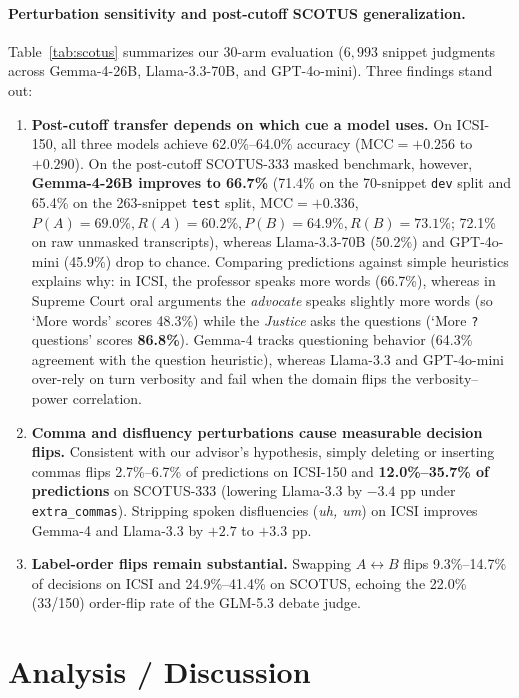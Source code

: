 \documentclass[11pt]{article}
\begin{document}
\paragraph{Perturbation sensitivity and post-cutoff SCOTUS generalization.}
Table~\ref{tab:scotus} summarizes our 30-arm evaluation ($6{,}993$ snippet judgments across Gemma-4-26B, Llama-3.3-70B, and GPT-4o-mini).
Three findings stand out:
\begin{enumerate}
\setlength\itemsep{1pt}
\item \textbf{Post-cutoff transfer depends on which cue a model uses.} On ICSI-150, all three models achieve 62.0\%--64.0\% accuracy ($\textrm{MCC}=+0.256$ to $+0.290$). On the post-cutoff SCOTUS-333 masked benchmark, however, \textbf{Gemma-4-26B improves to 66.7\%} (71.4\% on the 70-snippet \texttt{dev} split and 65.4\% on the 263-snippet \texttt{test} split, $\textrm{MCC}=+0.336$, $P(A)=69.0\%, R(A)=60.2\%, P(B)=64.9\%, R(B)=73.1\%$; 72.1\% on raw unmasked transcripts), whereas Llama-3.3-70B (50.2\%) and GPT-4o-mini (45.9\%) drop to chance. Comparing predictions against simple heuristics explains why: in ICSI, the professor speaks more words (66.7\%), whereas in Supreme Court oral arguments the \emph{advocate} speaks slightly more words (so `More words' scores 48.3\%) while the \emph{Justice} asks the questions (`More \texttt{?} questions' scores \textbf{86.8\%}). Gemma-4 tracks questioning behavior (64.3\% agreement with the question heuristic), whereas Llama-3.3 and GPT-4o-mini over-rely on turn verbosity and fail when the domain flips the verbosity--power correlation.
\item \textbf{Comma and disfluency perturbations cause measurable decision flips.} Consistent with our advisor's hypothesis, simply deleting or inserting commas flips 2.7\%--6.7\% of predictions on ICSI-150 and \textbf{12.0\%--35.7\% of predictions} on SCOTUS-333 (lowering Llama-3.3 by $-3.4$ pp under \texttt{extra\_commas}). Stripping spoken disfluencies (\emph{uh, um}) on ICSI improves Gemma-4 and Llama-3.3 by $+2.7$ to $+3.3$ pp.
\item \textbf{Label-order flips remain substantial.} Swapping $A \leftrightarrow B$ flips 9.3\%--14.7\% of decisions on ICSI and 24.9\%--41.4\% on SCOTUS, echoing the 22.0\% (33/150) order-flip rate of the GLM-5.3 debate judge.
\end{enumerate}

\section{Analysis / Discussion}
\label{sec:discussion}
\end{document}
